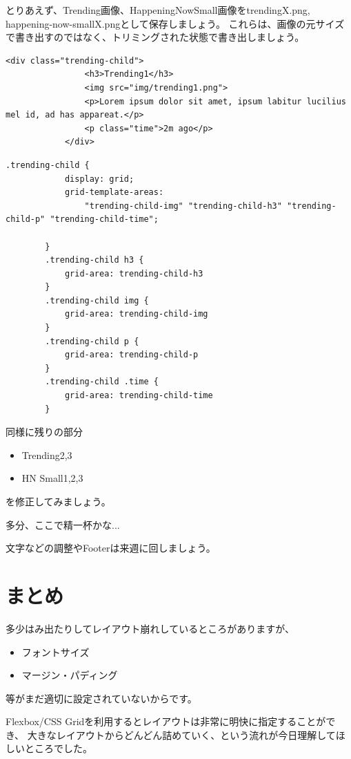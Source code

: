 \documentclass[mingoth,11pt,a4j,uplatex,dvipdfmx]{jsarticle}
\begin{document}
とりあえず、Trending画像、HappeningNowSmall画像をtrendingX.png, happening-now-smallX.pngとして保存しましょう。
これらは、画像の元サイズで書き出すのではなく、トリミングされた状態で書き出しましょう。

\begin{lstlisting}[caption=.trending-childのHTML変更]
            <div class="trending-child">
                <h3>Trending1</h3>
                <img src="img/trending1.png">
                <p>Lorem ipsum dolor sit amet, ipsum labitur lucilius mel id, ad has appareat.</p>
                <p class="time">2m ago</p>
            </div>
\end{lstlisting}

\begin{lstlisting}[caption=.trending-childのレイアウト]
        .trending-child {
            display: grid;
            grid-template-areas: 
                "trending-child-img" "trending-child-h3" "trending-child-p" "trending-child-time";

        }
        .trending-child h3 {
            grid-area: trending-child-h3
        }
        .trending-child img {
            grid-area: trending-child-img
        }
        .trending-child p {
            grid-area: trending-child-p
        }
        .trending-child .time {
            grid-area: trending-child-time
        }
\end{lstlisting}

同様に残りの部分
\begin{itemize}
\item Trending2,3
\item HN Small1,2,3
\end{itemize}
を修正してみましょう。

多分、ここで精一杯かな...

文字などの調整やFooterは来週に回しましょう。

\section{まとめ}
多少はみ出たりしてレイアウト崩れしているところがありますが、
\begin{itemize}
\item フォントサイズ
\item マージン・パディング
\end{itemize}
等がまだ適切に設定されていないからです。

Flexbox/CSS Gridを利用するとレイアウトは非常に明快に指定することができ、
大きなレイアウトからどんどん詰めていく、という流れが今日理解してほしいところでした。








\end{document}
